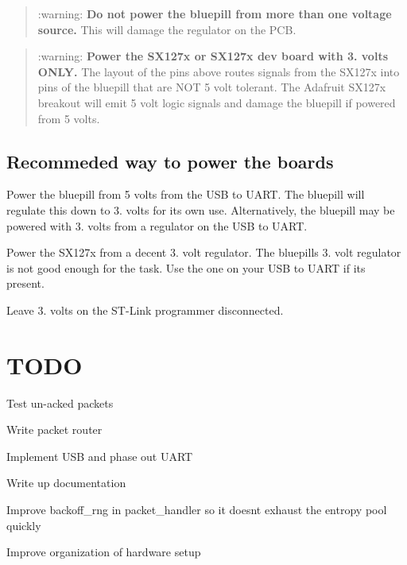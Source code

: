 \begin{quote}
\+:warning\+: {\bfseries Do not power the bluepill from more than one voltage source.} This will damage the regulator on the P\+CB. \end{quote}


\begin{quote}
\+:warning\+: {\bfseries Power the S\+X127x or S\+X127x dev board with 3. volts O\+N\+LY.} The layout of the pins above routes signals from the S\+X127x into pins of the bluepill that are N\+OT 5 volt tolerant. The Adafruit S\+X127x breakout will emit 5 volt logic signals and damage the bluepill if powered from 5 volts. \end{quote}


\subsection*{Recommeded way to power the boards}


\begin{DoxyEnumerate}
\item Power the bluepill from 5 volts from the U\+SB to U\+A\+RT. The bluepill will regulate this down to 3. volts for its own use. Alternatively, the bluepill may be powered with 3. volts from a regulator on the U\+SB to U\+A\+RT.
\item Power the S\+X127x from a decent 3. volt regulator. The bluepill\textquotesingle{}s 3. volt regulator is not good enough for the task. Use the one on your U\+SB to U\+A\+RT if it\textquotesingle{}s present.
\item Leave 3. volts on the S\+T-\/\+Link programmer disconnected.
\end{DoxyEnumerate}

\section*{T\+O\+DO}


\begin{DoxyEnumerate}
\item Test un-\/acked packets
\item Write packet router
\item Implement U\+SB and phase out U\+A\+RT
\item Write up documentation
\item Improve backoff\+\_\+rng in packet\+\_\+handler so it doesn\textquotesingle{}t exhaust the entropy pool quickly
\item Improve organization of hardware setup
\end{DoxyEnumerate}

